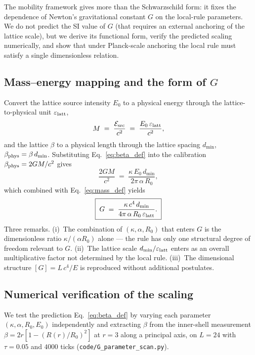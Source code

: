 \documentclass[11pt,a4paper]{article}
\begin{document}
The mobility framework gives more than the Schwarzschild form:
it fixes the dependence of Newton's gravitational constant $G$
on the local-rule parameters. We do not predict the SI value of
$G$ (that requires an external anchoring of the lattice scale),
but we derive its functional form, verify the predicted scaling
numerically, and show that under Planck-scale anchoring the
local rule must satisfy a single dimensionless relation.

\subsection{Mass--energy mapping and the form of $G$}

Convert the lattice source intensity $E_0$ to a physical energy
through the lattice-to-physical unit $\varepsilon_{\rm latt}$,
\begin{equation}
M \;=\; \frac{\mathcal{E}_{\rm src}}{c^2}
   \;=\; \frac{E_0\,\varepsilon_{\rm latt}}{c^2},
\label{eq:mass_def}
\end{equation}
and the lattice $\beta$ to a physical length through the
lattice spacing $d_{\min}$, $\beta_{\rm phys} = \beta\,
d_{\min}$. Substituting Eq.~\eqref{eq:beta_def} into the
calibration $\beta_{\rm phys} = 2GM/c^2$ gives
\begin{equation}
\frac{2GM}{c^2}
\;=\; \frac{\kappa\, E_0\, d_{\min}}{2\pi\, \alpha\, R_0},
\end{equation}
which combined with Eq.~\eqref{eq:mass_def} yields
\begin{equation}
\boxed{\;
G \;=\; \frac{\kappa\, c^4\, d_{\min}}
              {4\pi\, \alpha\, R_0\, \varepsilon_{\rm latt}}.
\;}
\label{eq:G_form}
\end{equation}
Three remarks. (i)~The combination of $(\kappa, \alpha, R_0)$
that enters $G$ is the dimensionless ratio $\kappa/(\alpha
R_0)$ alone --- the rule has only one structural degree of
freedom relevant to $G$. (ii)~The lattice scale
$d_{\min}/\varepsilon_{\rm latt}$ enters as an overall
multiplicative factor not determined by the local rule.
(iii)~The dimensional structure $[G] = L\,c^4/E$ is reproduced
without additional postulates.

\subsection{Numerical verification of the scaling}

We test the prediction Eq.~\eqref{eq:beta_def} by varying each
parameter $(\kappa, \alpha, R_0, E_0)$ independently and
extracting $\beta$ from the inner-shell measurement
$\beta = 2 r [1 - (R(r)/R_0)^2]$ at $r = 3$ along a principal
axis, on $L = 24$ with $\tau = 0.05$ and $4000$ ticks
(\texttt{code/G\_parameter\_scan.py}).
\end{document}
